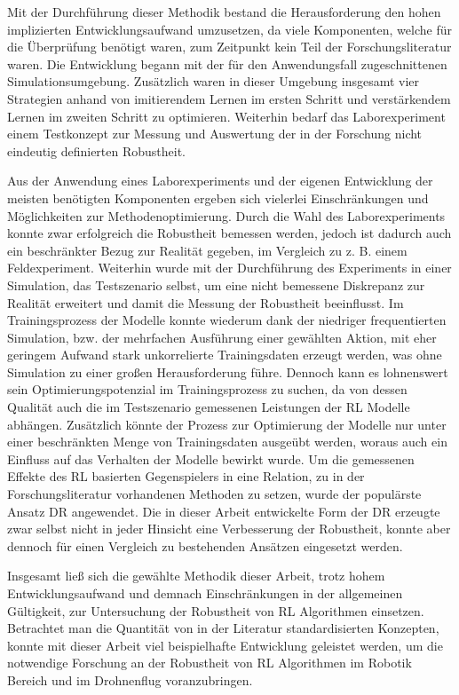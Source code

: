 Mit der Durchführung dieser Methodik bestand die Herausforderung den hohen implizierten Entwicklungsaufwand umzusetzen, da viele Komponenten, welche für die Überprüfung benötigt waren, zum Zeitpunkt kein Teil der Forschungsliteratur waren.
Die Entwicklung begann mit der für den Anwendungsfall zugeschnittenen Simulationsumgebung.
Zusätzlich waren in dieser Umgebung insgesamt vier Strategien anhand von imitierendem Lernen im ersten Schritt und verstärkendem Lernen im zweiten Schritt zu optimieren. 
Weiterhin bedarf das Laborexperiment einem Testkonzept zur Messung und Auswertung der in der Forschung nicht eindeutig definierten Robustheit.

Aus der Anwendung eines Laborexperiments und der eigenen Entwicklung der meisten benötigten Komponenten ergeben sich vielerlei Einschränkungen und Möglichkeiten zur Methodenoptimierung. %
Durch die Wahl des Laborexperiments konnte zwar erfolgreich die Robustheit bemessen werden, jedoch ist dadurch auch ein beschränkter Bezug zur Realität gegeben, im Vergleich zu z. B. einem Feldexperiment.
Weiterhin wurde mit der Durchführung des Experiments in einer Simulation, das Testszenario selbst, um eine nicht bemessene Diskrepanz zur Realität erweitert und damit die Messung der Robustheit beeinflusst.
Im Trainingsprozess der Modelle konnte wiederum dank der niedriger frequentierten Simulation, bzw. der mehrfachen Ausführung einer gewählten Aktion, mit eher geringem Aufwand stark unkorrelierte Trainingsdaten erzeugt werden, was ohne Simulation zu einer großen Herausforderung führe.
Dennoch kann es lohnenswert sein Optimierungspotenzial im Trainingsprozess zu suchen, da von dessen Qualität auch die im Testszenario gemessenen Leistungen der RL Modelle abhängen.
Zusätzlich könnte der Prozess zur Optimierung der Modelle nur unter einer beschränkten Menge von Trainingsdaten ausgeübt werden, woraus auch ein Einfluss auf das Verhalten der Modelle bewirkt wurde.
Um die gemessenen Effekte des RL basierten Gegenspielers in eine Relation, zu in der Forschungsliteratur vorhandenen Methoden zu setzen, wurde der populärste Ansatz DR angewendet.
Die in dieser Arbeit entwickelte Form der DR erzeugte zwar selbst nicht in jeder Hinsicht eine Verbesserung der Robustheit, konnte aber dennoch für einen Vergleich zu bestehenden Ansätzen eingesetzt werden.

Insgesamt ließ sich die gewählte Methodik dieser Arbeit, trotz hohem Entwicklungsaufwand und demnach Einschränkungen in der allgemeinen Gültigkeit, zur Untersuchung der Robustheit von RL Algorithmen einsetzen.
Betrachtet man die Quantität von in der Literatur standardisierten Konzepten, konnte mit dieser Arbeit viel beispielhafte Entwicklung geleistet werden, um die notwendige Forschung an der Robustheit von RL Algorithmen im Robotik Bereich und im Drohnenflug voranzubringen.


